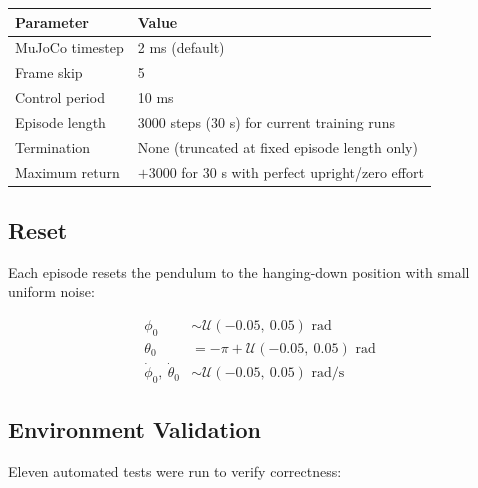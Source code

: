 \documentclass[12pt,a4paper]{article}
\begin{document}
\begin{center}
\begin{tabular}{ll}
\toprule
\textbf{Parameter} & \textbf{Value} \\
\midrule
MuJoCo timestep & 2 ms (default) \\
Frame skip & 5 \\
Control period & 10 ms \\
Episode length & 3000 steps (30 s) for current training runs \\
Termination & None (truncated at fixed episode length only) \\
Maximum return & $+3000$ for 30 s with perfect upright/zero effort \\
\bottomrule
\end{tabular}
\end{center}

\subsection{Reset}

Each episode resets the pendulum to the hanging-down position with small
uniform noise:

\begin{align}
\phi_0 &\sim \mathcal{U}(-0.05,\ 0.05) \text{ rad} \\
\theta_0 &= -\pi + \mathcal{U}(-0.05,\ 0.05) \text{ rad} \\
\dot\phi_0,\ \dot\theta_0 &\sim \mathcal{U}(-0.05,\ 0.05) \text{ rad/s}
\end{align}

\subsection{Environment Validation}

Eleven automated tests were run to verify correctness:
\end{document}
